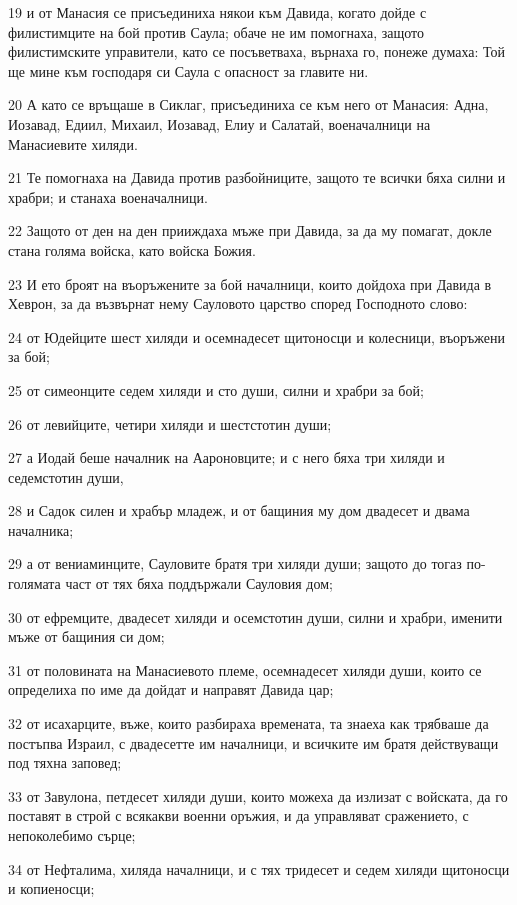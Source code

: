 \par 19 и от Манасия се присъединиха някои към Давида, когато дойде с филистимците на бой против Саула; обаче не им помогнаха, защото филистимските управители, като се посъветваха, върнаха го, понеже думаха: Той ще мине към господаря си Саула с опасност за главите ни.
\par 20 А като се връщаше в Сиклаг, присъединиха се към него от Манасия: Адна, Иозавад, Едиил, Михаил, Иозавад, Елиу и Салатай, военачалници на Манасиевите хиляди.
\par 21 Те помогнаха на Давида против разбойниците, защото те всички бяха силни и храбри; и станаха военачалници.
\par 22 Защото от ден на ден прииждаха мъже при Давида, за да му помагат, докле стана голяма войска, като войска Божия.
\par 23 И ето броят на въоръжените за бой началници, които дойдоха при Давида в Хеврон, за да възвърнат нему Сауловото царство според Господното слово:
\par 24 от Юдейците шест хиляди и осемнадесет щитоносци и колесници, въоръжени за бой;
\par 25 от симеонците седем хиляди и сто души, силни и храбри за бой;
\par 26 от левийците, четири хиляди и шестстотин души;
\par 27 а Иодай беше началник на Аароновците; и с него бяха три хиляди и седемстотин души,
\par 28 и Садок силен и храбър младеж, и от бащиния му дом двадесет и двама началника;
\par 29 а от вениаминците, Сауловите братя три хиляди души; защото до тогаз по-голямата част от тях бяха поддържали Сауловия дом;
\par 30 от ефремците, двадесет хиляди и осемстотин души, силни и храбри, именити мъже от бащиния си дом;
\par 31 от половината на Манасиевото племе, осемнадесет хиляди души, които се определиха по име да дойдат и направят Давида цар;
\par 32 от исахарците, въже, които разбираха времената, та знаеха как трябваше да постъпва Израил, с двадесетте им началници, и всичките им братя действуващи под тяхна заповед;
\par 33 от Завулона, петдесет хиляди души, които можеха да излизат с войската, да го поставят в строй с всякакви военни оръжия, и да управляват сражението, с непоколебимо сърце;
\par 34 от Нефталима, хиляда началници, и с тях тридесет и седем хиляди щитоносци и копиеносци;
